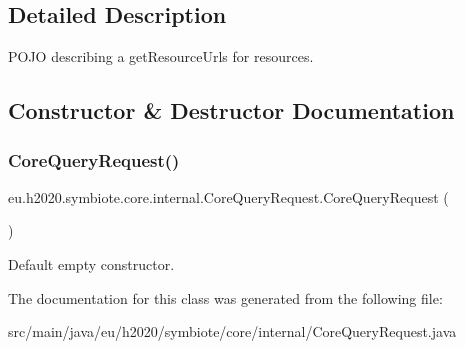 \subsection{Detailed Description}
P\+O\+JO describing a get\+Resource\+Urls for resources. 

\subsection{Constructor \& Destructor Documentation}
\mbox{\label{classeu_1_1h2020_1_1symbiote_1_1core_1_1internal_1_1CoreQueryRequest_a6377f7640add9a0e3c0ea7bfd2d81f5b}} 
\subsubsection{\texorpdfstring{Core\+Query\+Request()}{CoreQueryRequest()}}
{\footnotesize\ttfamily eu.\+h2020.\+symbiote.\+core.\+internal.\+Core\+Query\+Request.\+Core\+Query\+Request (\begin{DoxyParamCaption}{ }\end{DoxyParamCaption})}

Default empty constructor. 

The documentation for this class was generated from the following file\+:\begin{DoxyCompactItemize}
\item 
src/main/java/eu/h2020/symbiote/core/internal/Core\+Query\+Request.\+java\end{DoxyCompactItemize}
